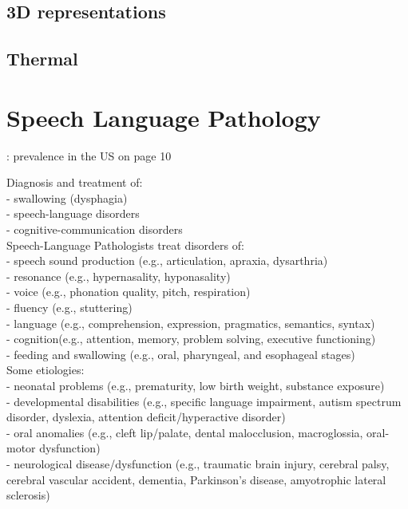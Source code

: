 \subsection{3D representations}

\subsection{Thermal}


\section{Speech Language Pathology}
\label{sec:SLP}
\cite{SLPathologies}: prevalence in the US on page 10

Diagnosis and treatment of:\\
- swallowing (dysphagia) \\
- speech-language disorders\\
- cognitive-communication disorders\\


Speech-Language Pathologists treat disorders of:\\
- speech sound production (e.g., articulation, apraxia, dysarthria)\\
- resonance (e.g., hypernasality, hyponasality)\\
- voice (e.g., phonation quality, pitch, respiration)\\
- fluency (e.g., stuttering)\\
- language (e.g., comprehension, expression, pragmatics, semantics, syntax)\\
- cognition(e.g., attention, memory, problem solving, executive functioning)\\
- feeding and swallowing (e.g., oral, pharyngeal, and esophageal stages) \\

Some etiologies:\\
- neonatal problems (e.g., prematurity, low birth weight, substance exposure)\\
- developmental disabilities (e.g., specific language impairment, autism spectrum
disorder, dyslexia, attention deficit/hyperactive disorder)\\
- oral anomalies (e.g., cleft lip/palate, dental malocclusion, macroglossia, oral-motor
dysfunction)\\
- neurological disease/dysfunction (e.g., traumatic brain injury, cerebral palsy, cerebral
vascular accident, dementia, Parkinson's disease, amyotrophic lateral sclerosis)\\



